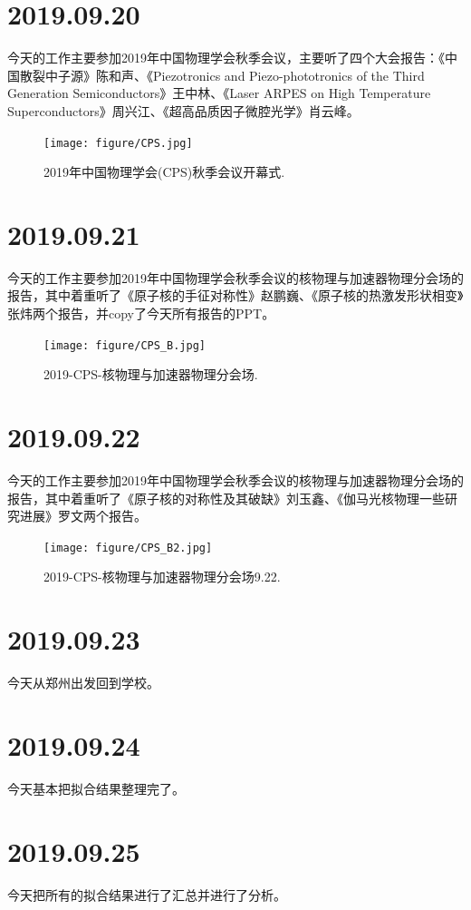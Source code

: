 \section{2019.09.20}
今天的工作主要参加2019年中国物理学会秋季会议，主要听了四个大会报告：《中国散裂中子源》陈和声、《Piezotronics and Piezo-phototronics of the Third Generation Semiconductors》王中林、《Laser ARPES on High Temperature Superconductors》周兴江、《超高品质因子微腔光学》肖云峰。
\begin{figure}[H]
\centering
\texttt{[image: figure/CPS.jpg]}
\caption{2019年中国物理学会(CPS)秋季会议开幕式.\label{fig_CPS}}
\end{figure}

\section{2019.09.21}
今天的工作主要参加2019年中国物理学会秋季会议的核物理与加速器物理分会场的报告，其中着重听了《原子核的手征对称性》赵鹏巍、《原子核的热激发形状相变》张炜两个报告，并copy了今天所有报告的PPT。
\begin{figure}[H]
\centering
\texttt{[image: figure/CPS\_B.jpg]}
\caption{2019-CPS-核物理与加速器物理分会场.\label{fig_CPS_B}}
\end{figure}

\section{2019.09.22}
今天的工作主要参加2019年中国物理学会秋季会议的核物理与加速器物理分会场的报告，其中着重听了《原子核的对称性及其破缺》刘玉鑫、《伽马光核物理一些研究进展》罗文两个报告。
\begin{figure}[H]
\centering
\texttt{[image: figure/CPS\_B2.jpg]}
\caption{2019-CPS-核物理与加速器物理分会场9.22.\label{fig_CPS_B2}}
\end{figure}

\section{2019.09.23}
今天从郑州出发回到学校。

\section{2019.09.24}
今天基本把拟合结果整理完了。

\section{2019.09.25}
今天把所有的拟合结果进行了汇总并进行了分析。

